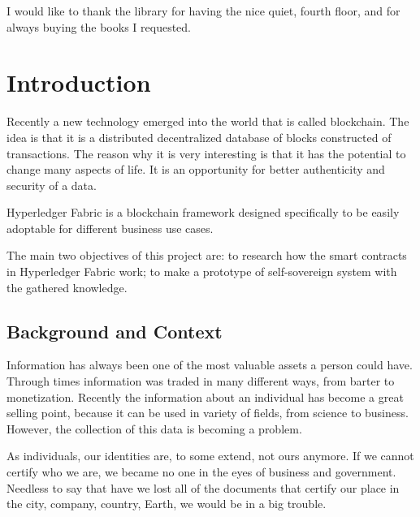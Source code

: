 \documentclass[a4paper,11pt]{report}
\begin{document}
I would like to thank the library for having the nice quiet, fourth floor, and for always buying the books I requested. 


\tableofcontents

\listoffigures                


\clearpage


\setcounter{page}{1}



\chapter{Introduction}

\label{introduction}

Recently a new technology emerged into the world that is called blockchain. The idea is that it is a distributed decentralized database of blocks constructed of transactions. The reason why it is very interesting is that it has the potential to change many aspects of life. It is an opportunity for better authenticity and security of a data. 

Hyperledger Fabric is a blockchain framework designed specifically to be easily adoptable for different business use cases. 

The main two objectives of this project are: to research how the smart contracts in Hyperledger Fabric work; to make a prototype of self-sovereign system with the gathered knowledge. 

\section{Background and Context}

\label{introduction-background}

Information has always been one of the most valuable assets a person could have. Through times information was traded in many different ways, from barter to monetization. Recently the information about an individual has become a great selling point, because it can be used in variety of fields, from science to business. However, the collection of this data is becoming a problem.

	As individuals, our identities are, to some extend, not ours anymore. If we cannot certify who we are, we became no one in the eyes of business and government. Needless to say that have we lost all of the documents that certify our place in the city, company, country, Earth, we would be in a big trouble. \cite{allen2016path}
	
\end{document}
